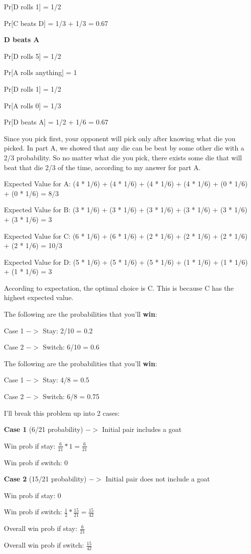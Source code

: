 \documentclass{6042}
\begin{document}
Pr[D rolls 1] = 1/2

Pr[C beats D] = 1/3 + 1/3 = 0.67

\textbf{D beats A}

Pr[D rolls 5] = 1/2

Pr[A rolls anything] = 1

Pr[D rolls 1] = 1/2

Pr[A rolls 0] = 1/3

Pr[D beats A] = 1/2 + 1/6 = 0.67



Since you pick first, your opponent will pick only after knowing what die you picked. In part A, we showed that any die can be beat
by some other die with a 2/3 probability. So no matter what die you pick, there exists some die that will beat that die 2/3 of the time, according
to my answer for part A.


Expected Value for A: (4 * 1/6) + (4 * 1/6) + (4 * 1/6) + (4 * 1/6) + (0 * 1/6) + (0 * 1/6) = 8/3

Expected Value for B: (3 * 1/6) + (3 * 1/6) + (3 * 1/6) + (3 * 1/6)  + (3 * 1/6) + (3 * 1/6) = 3

Expected Value for C: (6 * 1/6) + (6 * 1/6) + (2 * 1/6) + (2 * 1/6) + (2 * 1/6) + (2 * 1/6) = 10/3

Expected Value for D: (5 * 1/6) + (5 * 1/6) + (5 * 1/6) + (1 * 1/6) + (1 * 1/6) + (1 * 1/6) = 3

According to expectation, the optimal choice is C. This is because C has the highest expected value.



The following are the probabilities that you'll \textbf{win}:

Case 1 $->$ Stay: 2/10 = 0.2

Case 2 $->$ Switch: 6/10 = 0.6


The following are the probabilities that you'll \textbf{win}:

Case 1 $->$ Stay: 4/8 = 0.5

Case 2 $->$ Switch: 6/8 = 0.75


I'll break this problem up into 2 cases:

\textbf{Case 1} (6/21 probability) $->$ Initial pair includes a goat

Win prob if stay: $\frac{6}{21} * 1 = \frac{6}{21}$

Win prob if switch: 0

\textbf{Case 2} (15/21 probability) $->$ Initial pair does not include a goat

Win prob if stay: 0

Win prob if switch: $\frac{1}{2} * \frac{15}{21} = \frac{15}{42}$


Overall win prob if stay: $\frac{6}{21}$

Overall win prob if switch: $\frac{15}{42}$
\end{document}
